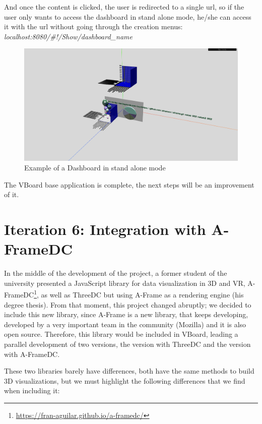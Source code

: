 \documentclass[a4paper, 12pt]{book}
\begin{document}
And once the content is clicked, the user is redirected to a single url, so if the user only wants to access the dashboard in stand alone mode, he/she can access it with the url without going through the creation menus: \textit{localhost:8080/\#!/Show/dashboard\_name}

\begin{figure}[H]
  \centering
  \includegraphics[width=16cm, keepaspectratio]{img/development/examplestandalone}
  \caption{Example of a Dashboard in stand alone mode}
  \label{fig:examplestandalone}
\end{figure}


The VBoard base application is complete, the next steps will be an improvement of it.

\section{Iteration 6: Integration with A-FrameDC}

In the middle of the development of the project, a former student of the university presented a JavaScript library for data visualization in 3D and VR, A-FrameDC\footnote{\url{https://fran-aguilar.github.io/a-framedc/}}, as well as ThreeDC but using A-Frame as a rendering engine (his degree thesis). From that moment, this project changed abruptly; we decided to include this new library, since A-Frame is a new library, that keeps developing, developed by a very important team in the community (Mozilla) and it is also open source. Therefore, this library would be included in VBoard, leading a parallel development of two versions, the version with ThreeDC and the version with A-FrameDC.

These two libraries barely have differences, both have the same methods to build 3D visualizations, but we must highlight the following differences that we find when including it:
\end{document}
